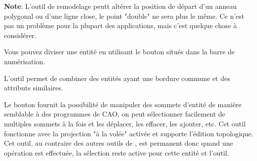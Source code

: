 \textbf{Note}: L'outil de remodelage peutt altérer la position de départ d'un anneau polygonal ou d'une ligne close, le point "double" ne sera plus le même. Ce n'est pas un problème pour la plupart des applications, mais c'est quelque chose à considérer.


Vous pouvez diviser une entité en utilisant le bouton  situés dans la barre de numérisation.


L'outil  permet de combiner des entités ayant une bordure commune et des attributs similaires.



Le bouton  fournit la possibilité de manipuler des sommets d'entité de manière semblable à des programmes de CAO, on peut sélectionner facilement de multiples sommets à la fois et les déplacer, les effacer, les ajouter, etc. Cet outil fonctionne avec la projection "à la volée" activée et supporte l'édition topologique. Cet outil, au contraire des autres outils de \qg, est permanent donc quand une opération est effectuée, la sélection reste active pour cette entité et l'outil.

